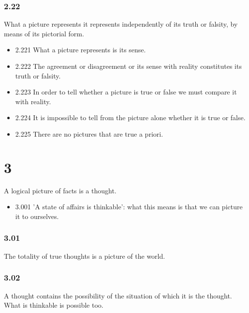 \documentclass[11pt]{article}
\begin{document}
\subsubsection*{2.22}
\label{sec:org85b9394}
What a picture represents it represents independently of its truth or
falsity, by means of its pictorial form.
\begin{itemize}
\item 2.221
\label{sec:org166ed71}
What a picture represents is its sense.
\item 2.222
\label{sec:orgc4e90a6}
The agreement or disagreement or its sense with reality constitutes
its truth or falsity.
\item 2.223
\label{sec:org54d199a}
In order to tell whether a picture is true or false we must compare
it with reality.
\item 2.224
\label{sec:orge6346b0}
It is impossible to tell from the picture alone whether it is true or
false.
\item 2.225
\label{sec:org73a768e}
There are no pictures that are true a priori.
\end{itemize}
\section*{3}
\label{sec:org69cab6a}
A logical picture of facts is a thought.
\begin{itemize}
\item 3.001
\label{sec:org24591d0}
'A state of affairs is thinkable': what this means is that we can
picture it to ourselves.
\end{itemize}
\subsubsection*{3.01}
\label{sec:org474da34}
The totality of true thoughts is a picture of the world.
\subsubsection*{3.02}
\label{sec:org25a18b4}
A thought contains the possibility of the situation of which it is the
thought. What is thinkable is possible too.
\end{document}
